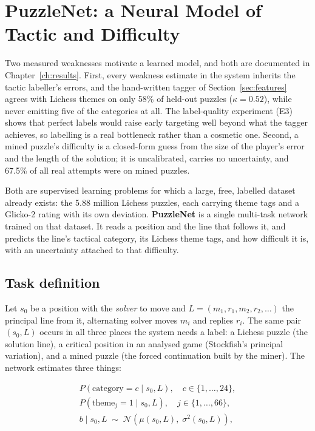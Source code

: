 \section{PuzzleNet: a Neural Model of Tactic and Difficulty}\label{sec:puzzlenet}

Two measured weaknesses motivate a learned model, and both are documented in
Chapter~\ref{ch:results}. First, every weakness estimate in the system inherits the tactic labeller's
errors, and the hand-written tagger of Section~\ref{sec:features} agrees with Lichess themes on only
58\% of held-out puzzles ($\kappa = 0.52$), while never emitting five of the categories at all. The
label-quality experiment (E3) shows that perfect labels would raise early targeting well beyond what
the tagger achieves, so labelling is a real bottleneck rather than a cosmetic one. Second, a mined
puzzle's difficulty is a closed-form guess from the size of the player's error and the length of the
solution; it is uncalibrated, carries no uncertainty, and 67.5\% of all real attempts were on mined
puzzles.

Both are supervised learning problems for which a large, free, labelled dataset already exists: the
5.88 million Lichess puzzles, each carrying theme tags and a Glicko-2 rating with its own deviation.
\textbf{PuzzleNet} is a single multi-task network trained on that dataset. It reads a position and the
line that follows it, and predicts the line's tactical category, its Lichess theme tags, and how
difficult it is, with an uncertainty attached to that difficulty.

\subsection{Task definition}

Let $s_0$ be a position with the \emph{solver} to move and $L = (m_1, r_1, m_2, r_2, \dots)$ the
principal line from it, alternating solver moves $m_i$ and replies $r_i$. The same pair $(s_0, L)$
occurs in all three places the system needs a label: a Lichess puzzle (the solution line), a critical
position in an analysed game (Stockfish's principal variation), and a mined puzzle (the forced
continuation built by the miner). The network estimates three things:

\begin{align}
  P(\text{category} = c \mid s_0, L), \quad c \in \{1,\dots,24\}, \\
  P(\text{theme}_j = 1 \mid s_0, L), \quad j \in \{1,\dots,66\}, \\
  b \mid s_0, L \;\sim\; \mathcal{N}\!\left(\mu(s_0, L),\; \sigma^2(s_0, L)\right),
\end{align}

